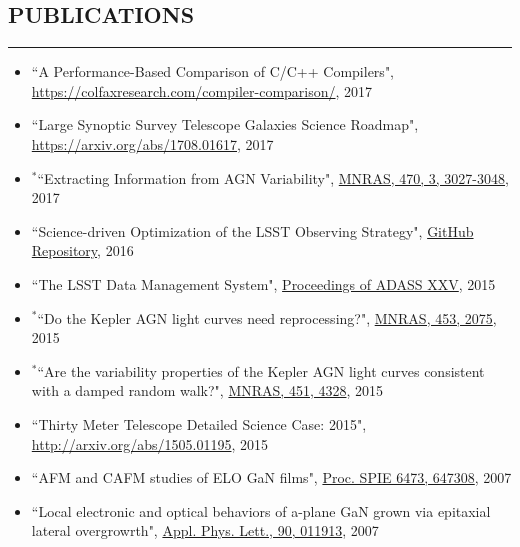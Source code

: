 \documentclass[10pt,a4]{article}
\newcounter{mySaveCounter}
\newcommand\myEnumReset{\setcounter{mySaveCounter}{0}}
\begin{document}
\subsection*{PUBLICATIONS}
\hrule  height 4pt
\vspace{0.2cm}
\begin{itemize}
    \item ``A Performance-Based Comparison of C/C++ Compilers", \href{https://colfaxresearch.com/compiler-comparison/}{https://colfaxresearch.com/compiler-comparison/}, 2017
	\item  ``Large Synoptic Survey Telescope Galaxies Science Roadmap", \href{https://arxiv.org/abs/1708.01617}{https://arxiv.org/abs/1708.01617}, 2017
	\item $\mathbf{^{*}}$``Extracting Information from AGN Variability", \href{https://doi.org/10.1093/mnras/stx1420}{MNRAS, 470, 3, 3027-3048}, 2017
	\item ``Science-driven Optimization of the LSST Observing Strategy", \href{https://github.com/LSSTScienceCollaborations/ObservingStrategy}{GitHub Repository}, 2016
	\item ``The LSST Data Management System", \href{http://adsabs.harvard.edu/cgi-bin/bib_query?arXiv:1512.07914}{Proceedings of ADASS XXV}, 2015
	\item $\mathbf{^{*}}$``Do the Kepler AGN light curves need reprocessing?", \href{http://dx.doi.org/10.1093/mnras/stv1797}{MNRAS, 453, 2075}, 2015
	\item $\mathbf{^{*}}$``Are the variability properties of the Kepler AGN light curves consistent with a damped random walk?", \href{http://dx.doi.org/ 10.1093/mnras/stv1230}{MNRAS, 451, 4328}, 2015
	\item  ``Thirty Meter Telescope Detailed Science Case: 2015", \href{http://arxiv.org/abs/1505.01195}{http://arxiv.org/abs/1505.01195}, 2015
	\item  ``AFM and CAFM studies of ELO GaN films", \href{http://dx.doi.org/10.1117/12.706773}{Proc. SPIE 6473, 647308}, 2007
	\item ``Local electronic and optical behaviors of a-plane GaN grown via epitaxial lateral overgrowrth", \href{http://dx.doi.org/10.1063/1.2429901}{Appl. Phys. Lett., 90, 011913}, 2007
\end{itemize}
\myEnumReset
\end{document}

